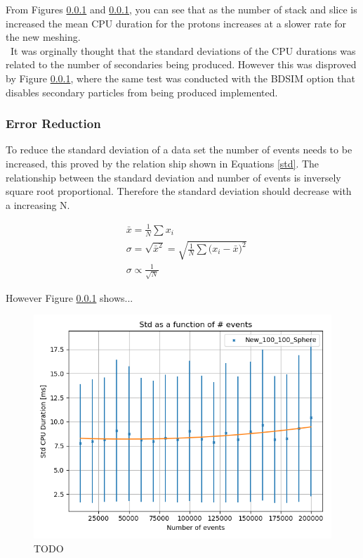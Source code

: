 \documentclass[12pt,a4paper]{article}
\begin{document}
\noindent From Figures \ref{} and \ref{}, you can see that as the number of stack and slice is increased the mean CPU duration for the protons increases at a slower rate for the new meshing. 
\\\
\noindent It was orginally thought that the standard deviations of the CPU durations was related to the number of secondaries being produced. However this was disproved by Figure \ref{}, where the same test was conducted with the BDSIM option that disables secondary particles from being produced implemented.

\subsubsection{Error Reduction}
To reduce the standard deviation of a data set the number of events needs to be increased, this proved by the relation ship shown in Equations \ref{std}. The relationship between the standard deviation and number of events is inversely square root proportional. Therefore the standard deviation should decrease with a increasing N.

\begin{equation}
\begin{aligned}
& \bar{x} = \frac{1}{N}\sum{x_i}\\
& \sigma = \sqrt{\bar{x}^2} = \sqrt{\frac{1}{N}\sum{(x_i - \bar{x}})^2}\\
& \sigma \propto \frac{1}{\sqrt{N}} 
\end{aligned}
\label{std}
\end{equation}

However Figure \ref{} shows...\\
\begin{figure}[h!]
\centering
\includegraphics[scale=0.5]{Images//Error//std_N.png}
\caption[width=\columnwidth]{TODO}
\label{sphbd}
\end{figure}
\end{document}
